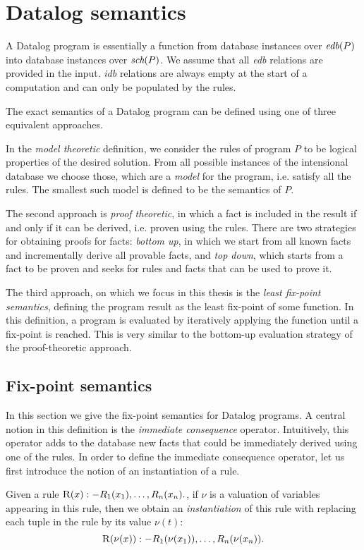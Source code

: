 \section{Datalog semantics}\label{ss:datalogsemantics}
A Datalog program is essentially a function from database instances over $\textit{edb}(P)$ into database instances over $\textit{sch}(P)$. We assume that all \emph{edb} relations are provided in the input. \emph{idb} relations are always empty at the start of a computation and can only be populated by the rules.

The exact semantics of a Datalog program can be defined using one of three  equivalent approaches.

In the \emph{model theoretic} definition, we consider the rules of program $P$ to be logical properties of the desired solution. From all possible instances of the intensional database we choose those, which are a \emph{model} for the program, i.e. satisfy all the rules. The smallest such model is defined to be the semantics of $P$.

The second approach is \emph{proof theoretic}, in which a fact is included in the result if and only if it can be derived, i.e. proven using the rules. There are two strategies for obtaining proofs for facts: \emph{bottom up}, in which we start from all known facts and incrementally derive all provable facts, and \emph{top down}, which starts from a fact to be proven and seeks for rules and facts that can be used to prove it.

The third approach, on which we focus in this thesis is the \emph{least fix-point semantics}, defining the program result as the least fix-point of some function. In this definition, a program is evaluated by iteratively applying the function until a fix-point is reached. This is very similar to the bottom-up evaluation strategy of the proof-theoretic approach.

\subsection{Fix-point semantics}
In this section we give the fix-point semantics for Datalog programs. A central notion in this definition is the \emph{immediate consequence} operator. Intuitively, this operator adds to the database new facts that could be immediately derived using one of the rules. In order to define the immediate consequence operator, let us first introduce the notion of an instantiation of a rule.

\begin{defn}[Instantiation]
Given a rule $ \textsc{R}(x) :- R_1(x_1), \dots, R_n(x_n). $, if $\nu$ is a valuation of variables appearing in this rule, then we obtain an \emph{instantiation} of this rule with replacing each tuple in the rule by its value $\nu(t)$:
$$ \textsc{R}(\nu(x)) :- R_1(\nu(x_1)), \dots, R_n(\nu(x_n)). $$
\end{defn}


